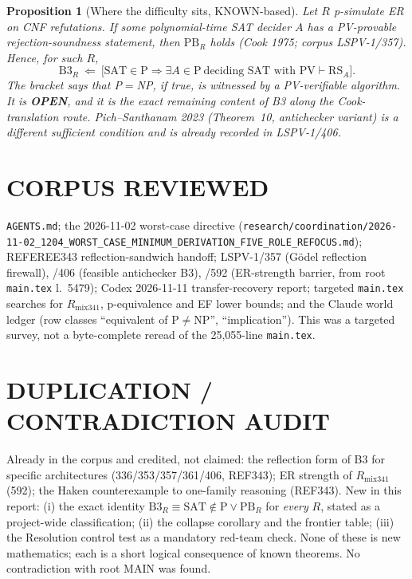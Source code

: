 \documentclass[11pt]{article}
\newtheorem{proposition}[theorem]{Proposition}
\newcommand{\SAT}{\mathrm{SAT}}
\newcommand{\PB}{\mathrm{PB}}
\begin{document}
\begin{proposition}[Where the difficulty sits, KNOWN-based]\label{p:pv}
Let $R$ p-simulate ER on CNF refutations. If some polynomial-time SAT decider $A$ has a PV-provable
rejection-soundness statement, then $\PB_R$ holds (Cook 1975; corpus LSPV-1/357). Hence, for such $R$,
\[
 \mathrm{B3}_R \ \Longleftarrow\ \bigl[\SAT\in\mathrm P\Rightarrow \exists A\in\mathrm P\ \text{deciding SAT with }
 \mathrm{PV}\vdash\mathrm{RS}_A\bigr].
\]
The bracket says that P$=$NP, if true, is witnessed by a PV-verifiable algorithm. It is \textbf{OPEN}, and
it is the exact remaining content of B3 along the Cook-translation route. Pich--Santhanam 2023
(Theorem~10, antichecker variant) is a different sufficient condition and is already recorded in LSPV-1/406.
\end{proposition}

\section*{CORPUS REVIEWED}
\texttt{AGENTS.md}; the 2026-11-02 worst-case directive
(\texttt{research/coordination/2026-11-02\_1204\_WORST\_CASE\_MINIMUM\_DERIVATION\_FIVE\_ROLE\_REFOCUS.md});
REFEREE343 reflection-sandwich handoff; LSPV-1/357 (G\"odel reflection firewall), /406 (feasible
antichecker B3), /592 (ER-strength barrier, from root \texttt{main.tex} l.~5479); Codex 2026-11-11 transfer-recovery
report; targeted \texttt{main.tex} searches for $R_{\mathrm{mix341}}$, p-equivalence and EF lower bounds; and the
Claude world ledger (row classes ``equivalent of P$\neq$NP'', ``implication''). This was a targeted survey, not
a byte-complete reread of the 25{,}055-line \texttt{main.tex}.

\section*{DUPLICATION / CONTRADICTION AUDIT}
Already in the corpus and credited, not claimed: the reflection form of B3 for specific architectures
(336/353/357/361/406, REF343); ER strength of $R_{\mathrm{mix341}}$ (592); the Haken counterexample to
one-family reasoning (REF343). New in this report: (i) the exact identity
$\mathrm{B3}_R\equiv\SAT\notin\mathrm P\vee\PB_R$ for \emph{every} $R$, stated as a project-wide classification;
(ii) the collapse corollary and the frontier table; (iii) the Resolution control test as a mandatory
red-team check. None of these is new mathematics; each is a short logical consequence of known theorems.
No contradiction with root MAIN was found.
\end{document}

